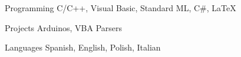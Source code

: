 

\begin{cvskills}


  \cvskill
    {Programming} %
    {C/C++, Visual Basic, Standard ML, C\#, LaTeX} %

  \cvskill
    {Projects} %
    {Arduinos, VBA Parsers} %

  \cvskill
    {Languages} %
    {Spanish, English, Polish, Italian} %

\end{cvskills}

